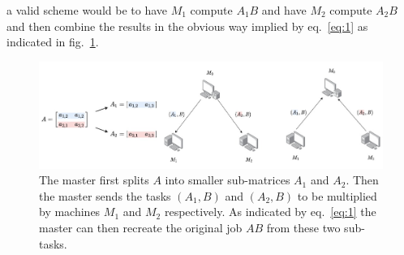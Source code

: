 \documentclass{report}
\begin{document}
a valid scheme would be to have $M_1$ compute $A_1 B$ and have $M_2$ compute $A_2 B$ and then combine the results in the obvious way implied by eq.~\eqref{eq:1} as indicated in fig.~\ref{fig:2}. 
\begin{figure}
    \centering
    \includegraphics[width=\textwidth]{dist_diag_1.jpg}
    \caption{The master first splits $A$ into smaller sub-matrices $A_1$ and $A_2$. Then the master sends the tasks $(A_1,B)$ and $(A_2,B)$ to be multiplied by machines $M_1$ and $M_2$ respectively. As indicated by eq.~\eqref{eq:1} the master can then recreate the original job $AB$ from these two sub-tasks.}
    \label{fig:2}
\end{figure}
\end{document}
